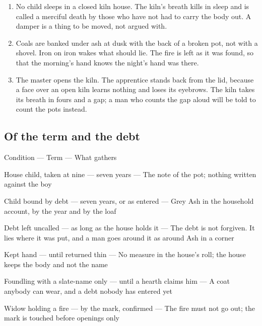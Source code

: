\documentclass{design/chronicle}
\begin{document}
\begin{enumerate}[leftmargin=1.4em,itemsep=1pt,topsep=3pt,parsep=0pt]

\item No child sleeps in a closed kiln house. The kiln’s breath kills in sleep and is called a merciful death by those who have not had to carry the body out. A damper is a thing to be moved, not argued with.

\item Coals are banked under ash at dusk with the back of a broken pot, not with a shovel. Iron on iron wakes what should lie. The fire is left as it was found, so that the morning’s hand knows the night’s hand was there.

\item The master opens the kiln. The apprentice stands back from the lid, because a face over an open kiln learns nothing and loses its eyebrows. The kiln takes its breath in fours and a gap; a man who counts the gap aloud will be told to count the pots instead.

\end{enumerate}

\subsection*{Of the term and the debt}

Condition — Term — What gathers\par

House child, taken at nine — seven years — The note of the pot; nothing written against the boy\par

Child bound by debt — seven years, or as entered — Grey Ash in the household account, by the year and by the loaf\par

Debt left uncalled — as long as the house holds it — The debt is not forgiven. It lies where it was put, and a man goes around it as around Ash in a corner\par

Kept hand — until returned thin — No measure in the house’s roll; the house keeps the body and not the name\par

Foundling with a slate-name only — until a hearth claims him — A coat anybody can wear, and a debt nobody has entered yet\par

Widow holding a fire — by the mark, confirmed — The fire must not go out; the mark is touched before openings only\par
\end{document}
